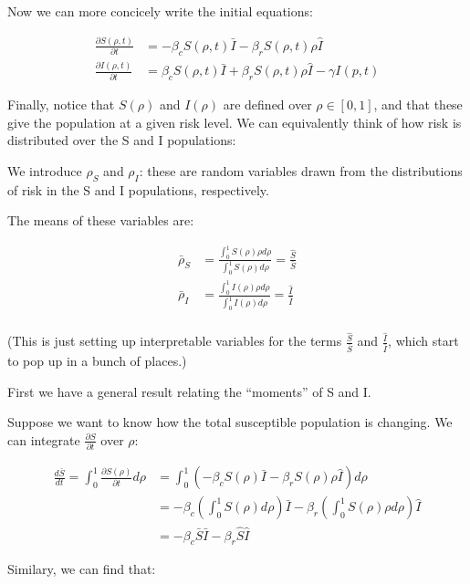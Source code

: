 Now we can more concicely write the initial equations:

\[
\begin{aligned}
\frac{\partial S(\rho, t)}{\partial t} &=
    -\beta_c S(\rho, t) \bar I
    -\beta_r S(\rho, t) \rho \hat I\\
\frac{\partial I(\rho, t)}{\partial t} &=
    \beta_c S(\rho, t) \bar I
    + \beta_r S(\rho, t) \rho \hat I - \gamma I(p, t)
\end{aligned}
\]

Finally, notice that \(S(\rho)\) and \(I(\rho)\) are defined over
\(\rho \in [0, 1]\), and that these give the population at a given risk
level. We can equivalently think of how risk is distributed over the S
and I populations:

We introduce \(\rho_S\) and \(\rho_I\): these are random variables drawn
from the distributions of risk in the S and I populations, respectively.

The means of these variables are:

\[
\begin{aligned}
\bar\rho_S
&= \frac{\int_{0}^{1} S(\rho) \rho d\rho}{\int_{0}^{1} S(\rho) d\rho}
= \frac{\hat S}{\bar S}\\
\bar\rho_I
&= \frac{\int_{0}^{1} I(\rho) \rho d\rho}{\int_{0}^{1} I(\rho) d\rho}
= \frac{\hat I}{\bar I}\\
\end{aligned}
\]

(This is just setting up interpretable variables for the terms
\(\frac{\hat S}{\bar S}\) and \(\frac{\hat I}{\bar I}\), which start to
pop up in a bunch of places.)

First we have a general result relating the ``moments'' of S and I.

Suppose we want to know how the total susceptible population is
changing. We can integrate \(\frac{\partial S}{\partial t}\) over
\(\rho\):

\[
\begin{aligned}
\frac{d \bar{S}}{dt} = \int_{0}^{1} \frac{\partial S(\rho)}{\partial t} d\rho
&= \int_{0}^{1} (-\beta_c S(\rho) \bar I - \beta_r S(\rho) \rho \hat I) d\rho  \\
&= -\beta_c (\int_{0}^{1} S(\rho) d\rho) \bar I
    - \beta_r (\int_{0}^{1} S(\rho) \rho d\rho) \hat I\\
&= -\beta_c \bar S \bar I - \beta_r \hat S \hat I
\end{aligned}
\]

Similary, we can find that:

